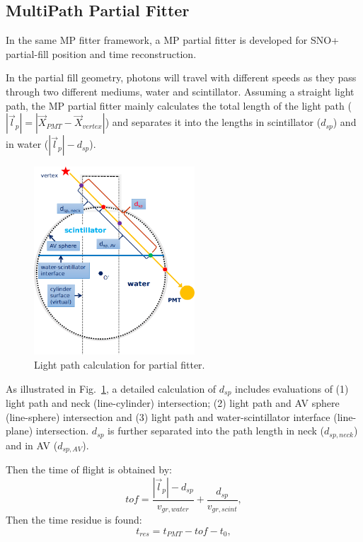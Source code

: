\documentclass[preprint,12pt]{elsarticle}
\numberwithin{equation}{section}
\begin{document}
\subsection{MultiPath Partial Fitter}
In the same MP fitter framework, a MP partial fitter is developed for SNO+ partial-fill position and time reconstruction.

In the partial fill geometry, photons will travel with different speeds as they pass through two different mediums, water and scintillator. Assuming a straight light path, the MP partial fitter mainly calculates the total length of the light path ($|\vec{l}_p|=|\vec{X}_{PMT}-\vec{X}_{vertex}|$) and separates it into the lengths in scintillator ($d_{sp}$) and in water ($|\vec{l}_p|-d_{sp}$).

\begin{figure}[!htb]
	\centering
	\includegraphics[width=6cm]{scintpath.png}
	\caption{Light path calculation for partial fitter.}
	\label{scintpath}
\end{figure}

As illustrated in Fig.~\ref{scintpath}, a detailed calculation of $d_{sp}$ includes evaluations of (1) light path and neck (line-cylinder) intersection; (2) light path and AV sphere (line-sphere) intersection and (3) light path and water-scintillator interface (line-plane) intersection. $d_{sp}$ is further separated into the path length in neck ($d_{sp,neck}$) and in AV ($d_{sp,AV}$).

Then the time of flight is obtained by:
\begin{equation}
tof = \frac{|\vec{l}_p|-d_{sp}}{v_{gr,water}} +\frac{d_{sp}}{v_{gr,scint}},
\end{equation}
Then the time residue is found:
\begin{equation}
t_{res} = t_{PMT}-tof-t_0,
\end{equation}
\end{document}
